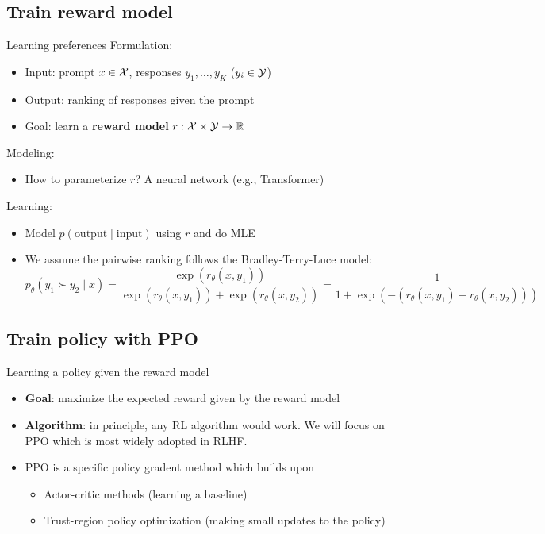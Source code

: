 \documentclass[usenames,dvipsnames,notes,11pt,aspectratio=169,hyperref={colorlinks=true, linkcolor=blue}]{beamer}
\begin{document}
\subsection{Train reward model}
\begin{frame}
    {Learning preferences}
    Formulation:\\
    \begin{itemize}
        \item Input: prompt $x\in\mathcal{X}$, responses $y_1,\ldots, y_K$ ($y_i\in\mathcal{Y}$)
        \item Output: ranking of responses given the prompt
        \item Goal: learn a {\bf reward model} $r: \mathcal{X} \times \mathcal{Y} \rightarrow \mathbb{R}$
    \end{itemize}

    \pause
    Modeling:\\
    \begin{itemize}
        \item How to parameterize $r$? A neural network (e.g., Transformer)
    \end{itemize}

    \pause
    Learning:\\
    \begin{itemize}
        \item Model $p(\text{output}\mid \text{input})$ using $r$ and do MLE
        \item We assume the pairwise ranking follows the Bradley-Terry-Luce model:
            $$
            p_\theta(y_1 \succ y_2 \mid x) = \frac{\exp(r_\theta(x,y_1))}
            {\exp(r_\theta(x,y_1)) + \exp(r_\theta(x,y_2))}
            = \frac{1}{1+\exp(-(r_\theta(x,y_1) - r_\theta(x,y_2)))}
            $$
    \end{itemize}
\end{frame}

\subsection{Train policy with PPO}
\begin{frame}
    {Learning a policy given the reward model}
    \begin{itemize}
        \itemsep1em
        \item {\bf Goal}: maximize the expected reward given by the reward model
        \item {\bf Algorithm}: in principle, any RL algorithm would work. We will focus on PPO which is most widely adopted in RLHF.
        \item PPO is a specific policy gradent method which builds upon
            \begin{itemize}
                \item Actor-critic methods (learning a baseline)
                \item Trust-region policy optimization (making small updates to the policy) 
            \end{itemize}
    \end{itemize}
\end{frame}
\end{document}
